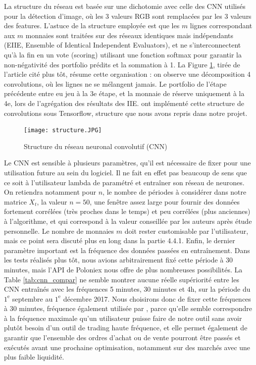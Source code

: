 \documentclass[a4paper, 10pt]{article}
\begin{document}
La structure du réseau est basée sur une dichotomie avec celle des CNN utilisés pour la détection d'image, où les 3 valeurs RGB sont remplacées par les 3 valeurs des features. L'astuce de la structure employée est que les $m$ lignes correspondant aux $m$ monnaies sont traitées sur des réseaux identiques mais indépendants (EIIE, Ensemble of Identical Independent Evaluators), et ne s'interconnectent qu'à la fin en un vote (scoring) utilisant une fonction softmax pour garantir la non-négativité des portfolio prédits et la sommation à 1. La Figure \ref{fig:structure}, tirée de l'article cité plus tôt, résume cette organisation : on observe une décomposition 4 convolutions, où les lignes ne se mélangent jamais. Le portfolio de l'étape précédente entre eu jeu à la 3e étape, et la monnaie de réserve uniquement à la 4e, lors de l'agrégation des résultats des IIE. \citet{Jiang2017} ont implémenté cette structure de convolutions sous Tensorflow, structure que nous avons repris dans notre projet.

\begin{figure}[ht!]
\begin{center}
\texttt{[image: structure.JPG]}
\caption{Structure du réseau neuronal convolutif (CNN)}
\label{fig:structure}
\end{center}
\end{figure}

Le CNN est sensible à plusieurs paramètres, qu'il est nécessaire de fixer pour une utilisation future au sein du logiciel. Il ne fait en effet pas beaucoup de sens que ce soit à l'utilisateur lambda de paramétré et entraîner son réseau de neurones. On retiendra notamment pour $n$, le nombre de périodes à considérer dans notre matrice $X_t$, la valeur  $n = 50$, une fenêtre assez large pour fournir des données fortement corrélées (très proches dans le temps) et peu corrélées (plus anciennes) à l'algorithme, et qui correspond à la valeur conseillée par les auteurs après étude personnelle. Le nombre de monnaies $m$ doit rester customisable par l'utilisateur, mais ce point sera discuté plus en long dans la partie 4.4.1. Enfin, le dernier paramètre important est la fréquence des données passées en entraînement. Dans les tests réalisés plus tôt, nous avions arbitrairement fixé cette période à 30 minutes, mais l'API de Poloniex nous offre de plus nombreuses possibilités. La Table \ref{tab:cnn_compar} ne semble montrer aucune réelle supériorité entre les CNN entraînés avec les fréquences 5 minutes, 30 minutes et 4h, sur la période du $1^{\text{e}}$ septembre au $1^{\text{e}}$ décembre 2017. Nous choisirons donc de fixer cette fréquences à 30 minutes, fréquence également utilisée par \citet{Jiang2017}, parce qu'elle semble correspondre à la fréquence maximale qu'un utilisateur puisse faire de notre outil sans avoir plutôt besoin d'un outil de trading haute fréquence, et elle permet également de garantir que l'ensemble des ordres d'achat ou de vente pourront être passés et exécutés avant une prochaine optimisation, notamment sur des marchés avec une plus faible liquidité.
\end{document}
